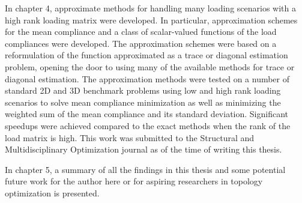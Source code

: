 In chapter 4, approximate methods for handling many loading scenarios with a high rank loading matrix were developed. In particular, approximation schemes for the mean compliance and a class of scalar-valued functions of the load compliances were developed. The approximation schemes were based on a reformulation of the function approximated as a trace or diagonal estimation problem, opening the door to using many of the available methods for trace or diagonal estimation. The approximation methods were tested on a number of standard 2D and 3D benchmark problems using low and high rank loading scenarios to solve mean compliance minimization as well as minimizing the weighted sum of the mean compliance and its standard deviation. Significant speedups were achieved compared to the exact methods when the rank of the load matrix is high. This work was submitted to the Structural and Multidisciplinary Optimization journal as of the time of writing this thesis. 

In chapter 5, a summary of all the findings in this thesis and some potential future work for the author here or for aspiring researchers in topology optimization is presented.

\clearpage
